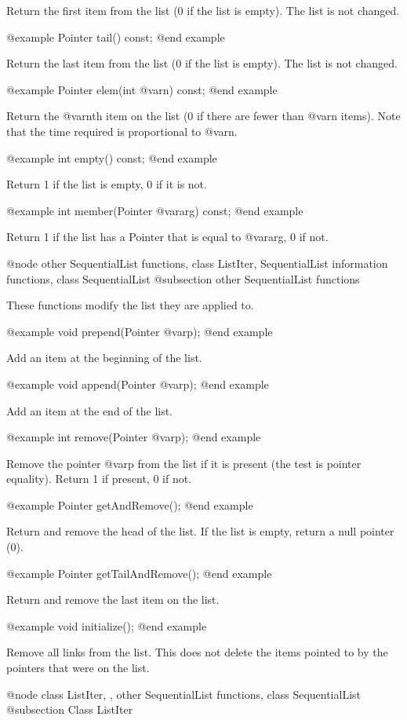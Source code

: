 Return the first item from the list (0 if the list is empty).  The
list is not changed.

@example
Pointer tail() const;
@end example

Return the last item from the list (0 if the list is empty).  The
list is not changed.

@example
Pointer elem(int @var{n}) const;
@end example

Return the @var{n}th item on the list (0 if there are fewer than @var{n} items).
Note that the time required is proportional to @var{n}.

@example
int empty() const;
@end example

Return 1 if the list is empty, 0 if it is not.

@example
int member(Pointer @var{arg}) const;
@end example

Return 1 if the list has a Pointer that is equal to @var{arg}, 0 if not.

@node other SequentialList functions, class ListIter, SequentialList information functions, class SequentialList
@subsection other SequentialList functions

These functions modify the list they are applied to.

@example
void prepend(Pointer @var{p});
@end example

Add an item at the beginning of the list.

@example
void append(Pointer @var{p});
@end example

Add an item at the end of the list.

@example
int remove(Pointer @var{p});
@end example

Remove the pointer @var{p} from the list if it is present (the test is pointer
equality).  Return 1 if present, 0 if not.

@example
Pointer getAndRemove();
@end example

Return and remove the head of the list.  If the list is empty, return
a null pointer (0).

@example
Pointer getTailAndRemove();
@end example

Return and remove the last item on the list.

@example
void initialize();
@end example

Remove all links from the list.  This does not delete the items pointed
to by the pointers that were on the list.

@node class ListIter,  , other SequentialList functions, class SequentialList
@subsection Class ListIter

